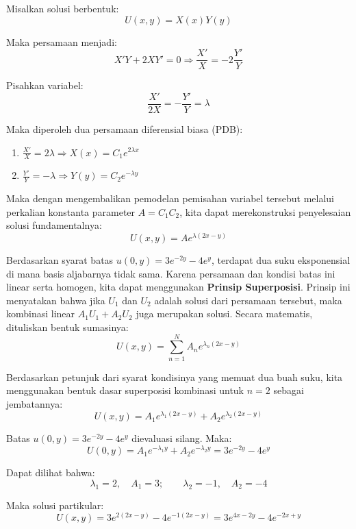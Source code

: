 \documentclass{article}
\theoremstyle{definition}
\begin{document}
\begin{enumerate}
        Misalkan solusi berbentuk:
        \[
          U(x,y) = X(x)Y(y)
        \]

        Maka persamaan menjadi:
        \[
          X'Y + 2XY' = 0 \Rightarrow \frac{X'}{X} = -2\frac{Y'}{Y}
        \]

        Pisahkan variabel:
        \[
          \frac{X'}{2X} = -\frac{Y'}{Y} = \lambda
        \]

        Maka diperoleh dua persamaan diferensial biasa (PDB):

        \begin{enumerate}
          \item $\displaystyle \frac{X'}{X} = 2\lambda \Rightarrow X(x) = C_1 e^{2\lambda x}$
          \item $\displaystyle \frac{Y'}{Y} = -\lambda \Rightarrow Y(y) = C_2 e^{-\lambda y}$
        \end{enumerate}

        Maka dengan mengembalikan pemodelan pemisahan variabel tersebut melalui perkalian konstanta parameter $A = C_1C_2$, kita dapat merekonstruksi penyelesaian solusi fundamentalnya:
        \[
          U(x,y) = A e^{\lambda(2x - y)}
        \]

        Berdasarkan syarat batas \(u(0,y) = 3e^{-2y} - 4e^y\), terdapat dua suku eksponensial di mana basis aljabarnya tidak sama. Karena persamaan dan kondisi batas ini linear serta homogen, kita dapat menggunakan \textbf{Prinsip Superposisi}. Prinsip ini menyatakan bahwa jika \(U_1\) dan \(U_2\) adalah solusi dari persamaan tersebut, maka kombinasi linear \(A_1 U_1 + A_2 U_2\) juga merupakan solusi. Secara matematis, dituliskan bentuk sumasinya:
        \[
          U(x,y) = \sum_{n=1}^{N} A_n e^{\lambda_n(2x - y)}
        \]

        Berdasarkan petunjuk dari syarat kondisinya yang memuat dua buah suku, kita menggunakan bentuk dasar superposisi kombinasi untuk $n=2$ sebagai jembatannya:
        \[
          U(x,y) = A_1 e^{\lambda_1(2x - y)} + A_2 e^{\lambda_2(2x - y)}
        \]

        Batas \( u(0,y) = 3e^{-2y} - 4e^y \) dievaluasi silang. Maka:
        \[
          U(0,y) = A_1 e^{-\lambda_1 y} + A_2 e^{-\lambda_2 y} = 3e^{-2y} - 4e^{y}
        \]

        Dapat dilihat bahwa:
        \[
          \lambda_1 = 2, \quad A_1 = 3; \qquad \lambda_2 = -1, \quad A_2 = -4
        \]

        Maka solusi partikular:
        \[
          U(x,y) = 3e^{2(2x - y)} - 4e^{-1(2x - y)} = 3e^{4x - 2y} - 4e^{-2x + y}
        \]

\end{enumerate}
\end{document}
